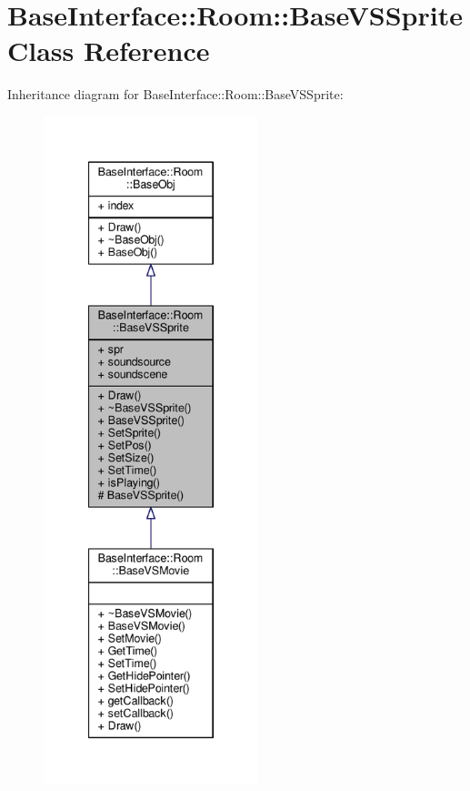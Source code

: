 \hypertarget{classBaseInterface_1_1Room_1_1BaseVSSprite}{}\section{Base\+Interface\+:\+:Room\+:\+:Base\+V\+S\+Sprite Class Reference}
\label{classBaseInterface_1_1Room_1_1BaseVSSprite}


Inheritance diagram for Base\+Interface\+:\+:Room\+:\+:Base\+V\+S\+Sprite\+:
\nopagebreak
\begin{figure}[H]
\begin{center}
\leavevmode
\includegraphics[height=550pt]{d8/da6/classBaseInterface_1_1Room_1_1BaseVSSprite__inherit__graph}
\end{center}
\end{figure}


